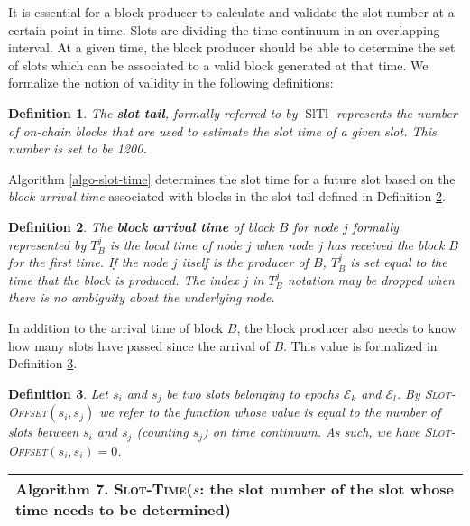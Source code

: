\documentclass{article}
\newcommand{\tmem}[1]{{\em #1\/}}
\newcommand{\tmname}[1]{\textsc{#1}}
\newcommand{\tmop}[1]{\ensuremath{\operatorname{#1}}}
\newcommand{\tmstrong}[1]{\textbf{#1}}
\newcommand{\tmtextbf}[1]{{\bfseries{#1}}}
\newcommand{\tmtextit}[1]{{\itshape{#1}}}
\newcommand{\tmtextsc}[1]{{\scshape{#1}}}
\newcommand{\tmtexttt}[1]{{\ttfamily{#1}}}
\newcommand{\tmverbatim}[1]{{\ttfamily{#1}}}
\newcounter{tmcounter}
\newcommand{\custombinding}[1]{%
  \setcounter{tmcounter}{#1}%
  \addtocounter{tmcounter}{-1}%
  \refstepcounter{tmcounter}}
\newtheorem{definition}{Definition}
\providecommand{\tmem}[1]{\tmtextit{#1}}
\providecommand{\tmname}[1]{\tmtextsc{#1}}
\providecommand{\tmop}[1]{\ensuremath{\mathrm{#1}}}
\providecommand{\tmstrong}[1]{\tmtextbf{#1}}
\providecommand{\tmtextbf}[1]{\tmtextbf{#1}}
\providecommand{\tmtextit}[1]{\tmtextit{#1}}
\providecommand{\tmverbatim}[1]{\tmtexttt{#1}}
\newtheorem{definition}{Definition}
\begin{document}
It is essential for a block producer to calculate and validate the slot number
at a certain point in time. Slots are dividing the time continuum in an
overlapping interval. At a given time, the block producer should be able to
determine the set of slots which can be associated to a valid block generated
at that time. We formalize the notion of validity in the following
definitions:

\begin{definition}
  \label{slot-time-cal-tail}The {\tmstrong{slot tail}}, formally referred to
  by $\tmop{SlTl}$ represents the number of on-chain blocks that are used to
  estimate the slot time of a given slot. This number is set to be 1200.
\end{definition}

Algorithm \ref{algo-slot-time} determines the slot time for a future slot
based on the {\tmem{block arrival time}} associated with blocks in the slot
tail defined in Definition \ref{defn-block-time}.

\begin{definition}
  \label{defn-block-time}The {\tmstrong{block arrival time}} of block $B$ for
  node $j$ formally represented by {\tmstrong{$T^j_B$}} is the local time
  of\tmverbatim{} node $j$ when node $j$ has received the block $B$ for the
  first time. If the node $j$ itself is the producer of $B$, $T_B^j$ is set
  equal to the time that the block is produced. The index $j$ in $T^j_B$
  notation may be dropped when there is no ambiguity about the underlying
  node.
\end{definition}

In addition to the arrival time of block $B$, the block producer also needs to
know how many slots have passed since the arrival of $B$. This value is
formalized in Definition \ref{defn-slot-offset}.

\begin{definition}
  \label{defn-slot-offset}Let $s_i$ and $s_j$ be two slots belonging to epochs
  $\mathcal{E}_k$ and $\mathcal{E}_l$. By {\tmname{Slot-Offset}}$(s_i, s_j)$
  we refer to the function whose value is equal to the number of slots between
  $s_i$ and $s_j$ (counting $s_j$) on time continuum. As such, we have
  {\tmname{Slot-Offset}}$(s_i, s_i) = 0$.
\end{definition}

\custombinding{7}{\noindent}\begin{tabular}{l}
  \hline
  \tmtextbf{Algorithm  7. } \label{algo-slot-time}{\tmname{Slot-Time}}($s$:
  the slot number of the slot whose time needs to be determined)\\
  \hline
\end{tabular}
\end{document}
